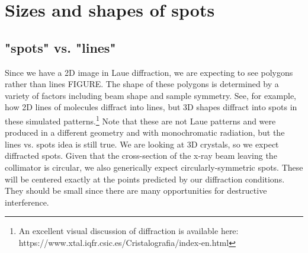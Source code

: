 \section{Sizes and shapes of spots}
\subsection{"spots" vs. "lines"}
Since we have a 2D image in Laue diffraction, we are expecting to see polygons rather than lines FIGURE. The shape of these polygons is determined by a variety of factors including beam shape and sample symmetry. See, for example, how 2D lines of molecules diffract into lines, but 3D shapes diffract into spots in these simulated patterns.\footnote{An excellent visual discussion of diffraction is available here: https://www.xtal.iqfr.csic.es/Cristalografia/index-en.html } Note that these are not Laue patterns and were produced in a different geometry and with monochromatic radiation, but the lines vs. spots idea is still true.
We are looking at 3D crystals, so we expect diffracted spots. Given that the cross-section of the x-ray beam leaving the collimator is circular, we also generically expect circularly-symmetric spots. These will be centered exactly at the points predicted by our diffraction conditions. They should be small since there are many opportunities for destructive interference.
